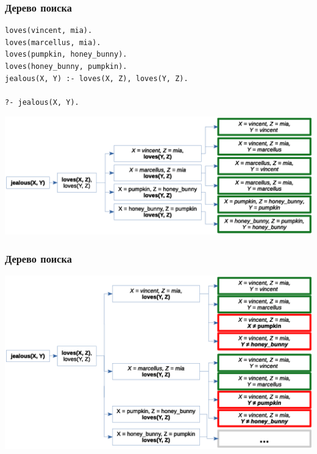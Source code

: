 \documentclass{../../slides-style}
\begin{document}
    \begin{frame}[fragile]
        \frametitle{Дерево поиска}
        \begin{verbatim}
loves(vincent, mia).
loves(marcellus, mia).
loves(pumpkin, honey_bunny).
loves(honey_bunny, pumpkin).
jealous(X, Y) :- loves(X, Z), loves(Y, Z).

?- jealous(X, Y).
        \end{verbatim}
    \vspace{-15mm}
    \includegraphics[scale=0.57]{prolog-tree.eps}
    \end{frame}

    \begin{frame}
        \frametitle{Дерево поиска}
    \includegraphics[scale=0.57]{prolog-tree-neg.eps}
    \end{frame}
\end{document}
